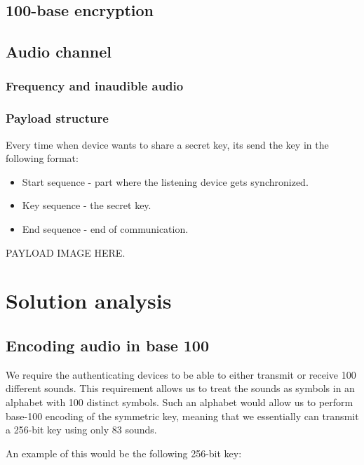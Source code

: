 \documentclass[12pt]{article}
\begin{document}
\subsection{100-base encryption}
\subsection{Audio channel}
\subsubsection{Frequency and inaudible audio}
\subsubsection{Payload structure}
Every time when device wants to share a secret key, its send the key in the following format:
\begin{itemize}


\item Start sequence - part where the listening device gets synchronized.
\item Key sequence - the secret key.
\item End sequence - end of communication.
\end{itemize}
PAYLOAD IMAGE HERE.

\section{Solution analysis}
\label{sec:Solution analysis}

\subsection{Encoding audio in base 100}
\label{sub:Encoding audio in base 100}

We require the authenticating devices to be able to either transmit or receive 100 different sounds. This requirement allows us to treat the sounds as symbols in an alphabet with 100 distinct symbols. Such an alphabet would allow us to perform base-100 encoding of the symmetric key, meaning that we essentially can transmit a 256-bit key using only 83 sounds.

An example of this would be the following 256-bit key:

\end{document}

